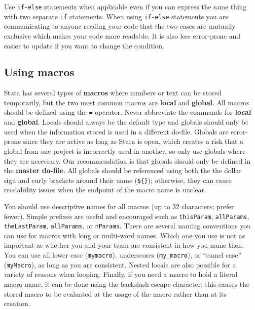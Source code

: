 
Use \texttt{if-else} statements when applicable
even if you can express the same thing with two separate \texttt{if} statements.
When using \texttt{if-else} statements you are communicating to anyone reading your code
that the two cases are mutually exclusive which makes your code more readable.
It is also less error-prone and easier to update if you want to change the condition.


\subsection{Using macros}

Stata has several types of \textbf{macros} where numbers or text can be stored temporarily,
but the two most common macros are \textbf{local} and \textbf{global}.
All macros should be defined using the \texttt{=} operator.
Never abbreviate the commands for \textbf{local} and \textbf{global}.
Locals should always be the default type and globals should only
be used when the information stored is used in a different do-file.
Globals are error-prone since they are active as long as Stata is open,
which creates a risk that a global from one project is incorrectly used in another,
so only use globals where they are necessary.
Our recommendation is that globals should only be defined in the \textbf{master do-file}.
All globals should be referenced using both the the dollar sign and curly brackets around their name (\texttt{\$\{\}});
otherwise, they can cause readability issues when the endpoint of the macro name is unclear.

You should use descriptive names for all macros (up to 32 characters; prefer fewer).
Simple prefixes are useful and encouraged such as \texttt{thisParam}, \texttt{allParams},
\texttt{theLastParam}, \texttt{allParams}, or \texttt{nParams}.
There are several naming conventions you can use for macros with long or multi-word names.
Which one you use is not as important as whether you and your team are consistent in how you name then.
You can use all lower case (\texttt{mymacro}), underscores (\texttt{my\_macro}),
or ``camel case'' (\texttt{myMacro}), as long as you are consistent.
Nested locals are also possible for a variety of reasons when looping.
Finally, if you need a macro to hold a literal macro name,
it can be done using the backslash escape character;
this causes the stored macro to be evaluated
at the usage of the macro rather than at its creation.

